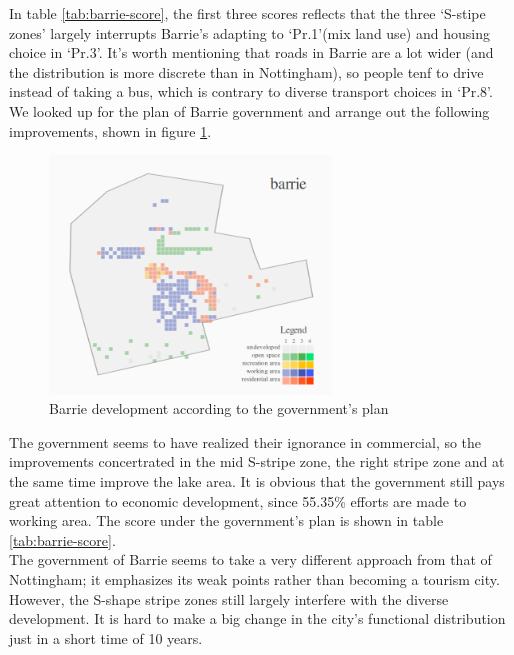 In table \ref{tab:barrie-score}, the first three scores reflects that the three `S-stipe zones' largely interrupts Barrie's adapting to `Pr.1'(mix land use) and housing choice in `Pr.3'.
It's worth mentioning that roads in Barrie are a lot wider (and the distribution is more discrete than in Nottingham), so people tenf to drive instead of taking a bus, which is contrary to diverse transport choices in `Pr.8'.\\

We looked up for the plan of Barrie government \cite{pdf:barrie-downtown-plan} \cite{pdf:barrie-waterfront} \cite{pdf:barrie-official-plan} \cite{pdf:barrie-industrial-mapping} and arrange out the following improvements, shown in figure \ref{fig:barrie-patch-diff}.\\
\begin{figure}[htb]
  \label{fig:barrie-patch-diff}
  \centering
  \includegraphics[width=7.5cm]{pic/barrie-patch-diff-development.png}
  \caption{Barrie development according to the government's plan}
\end{figure}

The government seems to have realized their ignorance in commercial, so the improvements concertrated in the mid S-stripe zone, the right stripe zone and at the same time improve the lake area.
It is obvious that the government still pays great attention to economic development, since 55.35\% efforts are made to working area.
The score under the government's plan is shown in table \ref{tab:barrie-score}.\\

The government of Barrie seems to take a very different approach from that of Nottingham; it emphasizes its weak points rather than becoming a tourism city.
However, the S-shape stripe zones still largely interfere with the diverse development.
It is hard to make a big change in the city's functional distribution just in a short time of 10 years.

